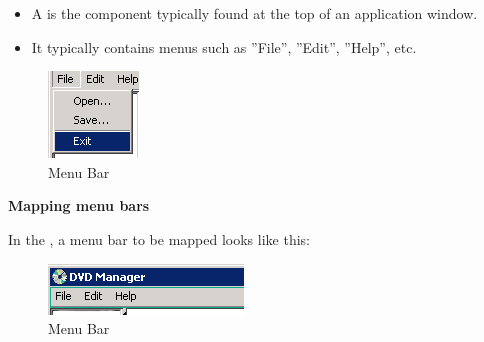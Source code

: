 \begin{itemize}
\item A  is the component typically 
found at the top of an application window.
\item It typically contains menus such as  ''File'', ''Edit'',
  ''Help'', etc.
\end{itemize}

\begin{figure}
\begin{center}
\includegraphics{PS/Menu}
\caption{Menu Bar}
\label{menu}
\end{center}
\end{figure}

\textbf{Mapping menu bars}

In the \gdomm{}, a menu bar to be mapped looks like this:

\begin{figure}
\begin{center}
\includegraphics{PS/Mapmenu}
\caption{Menu Bar}
\label{mapmenu}
\end{center}
\end{figure}